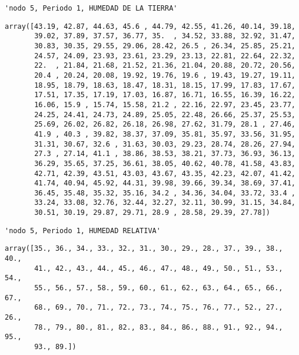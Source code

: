 \documentclass[11pt]{article}
\begin{document}
    \begin{verbatim}
'nodo 5, Periodo 1, HUMEDAD DE LA TIERRA'
    \end{verbatim}

    
    
    \begin{verbatim}
array([43.19, 42.87, 44.63, 45.6 , 44.79, 42.55, 41.26, 40.14, 39.18,
       39.02, 37.89, 37.57, 36.77, 35.  , 34.52, 33.88, 32.92, 31.47,
       30.83, 30.35, 29.55, 29.06, 28.42, 26.5 , 26.34, 25.85, 25.21,
       24.57, 24.09, 23.93, 23.61, 23.29, 23.13, 22.81, 22.64, 22.32,
       22.  , 21.84, 21.68, 21.52, 21.36, 21.04, 20.88, 20.72, 20.56,
       20.4 , 20.24, 20.08, 19.92, 19.76, 19.6 , 19.43, 19.27, 19.11,
       18.95, 18.79, 18.63, 18.47, 18.31, 18.15, 17.99, 17.83, 17.67,
       17.51, 17.35, 17.19, 17.03, 16.87, 16.71, 16.55, 16.39, 16.22,
       16.06, 15.9 , 15.74, 15.58, 21.2 , 22.16, 22.97, 23.45, 23.77,
       24.25, 24.41, 24.73, 24.89, 25.05, 22.48, 26.66, 25.37, 25.53,
       25.69, 26.02, 26.82, 26.18, 26.98, 27.62, 31.79, 28.1 , 27.46,
       41.9 , 40.3 , 39.82, 38.37, 37.09, 35.81, 35.97, 33.56, 31.95,
       31.31, 30.67, 32.6 , 31.63, 30.03, 29.23, 28.74, 28.26, 27.94,
       27.3 , 27.14, 41.1 , 38.86, 38.53, 38.21, 37.73, 36.93, 36.13,
       36.29, 35.65, 37.25, 36.61, 38.05, 40.62, 40.78, 41.58, 43.83,
       42.71, 42.39, 43.51, 43.03, 43.67, 43.35, 42.23, 42.07, 41.42,
       41.74, 40.94, 45.92, 44.31, 39.98, 39.66, 39.34, 38.69, 37.41,
       36.45, 35.48, 35.32, 35.16, 34.2 , 34.36, 34.04, 33.72, 33.4 ,
       33.24, 33.08, 32.76, 32.44, 32.27, 32.11, 30.99, 31.15, 34.84,
       30.51, 30.19, 29.87, 29.71, 28.9 , 28.58, 29.39, 27.78])
    \end{verbatim}

    
    
    \begin{verbatim}
'nodo 5, Periodo 1, HUMEDAD RELATIVA'
    \end{verbatim}

    
    
    \begin{verbatim}
array([35., 36., 34., 33., 32., 31., 30., 29., 28., 37., 39., 38., 40.,
       41., 42., 43., 44., 45., 46., 47., 48., 49., 50., 51., 53., 54.,
       55., 56., 57., 58., 59., 60., 61., 62., 63., 64., 65., 66., 67.,
       68., 69., 70., 71., 72., 73., 74., 75., 76., 77., 52., 27., 26.,
       78., 79., 80., 81., 82., 83., 84., 86., 88., 91., 92., 94., 95.,
       93., 89.])
    \end{verbatim}
\end{document}
